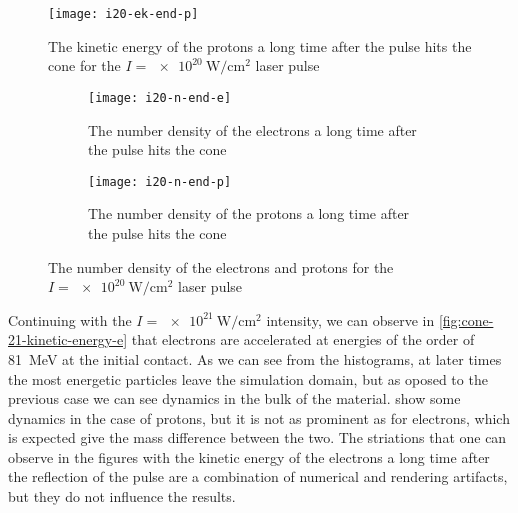\documentclass[12pt, class=report, crop=false]{standalone}
\begin{document}
\begin{figure}[h]
  \centering
  \texttt{[image: i20-ek-end-p]}
  \caption{The kinetic energy of the protons a long time after the pulse
  hits the cone for the \(I=\SI{e20}{\watt\per\centi\metre\squared}\)
  laser pulse}%
  \label{fig:cone-20-kinetic-energy-p}%
\end{figure}

\begin{figure}[h]
  \centering
  \begin{subfigure}[b]{0.475\textwidth}
    \centering
    \texttt{[image: i20-n-end-e]}
    \caption{The number density of the electrons a long time after the pulse
    hits the cone}%
  \end{subfigure}
  \hfill
  \begin{subfigure}[b]{0.475\textwidth}
    \centering
    \texttt{[image: i20-n-end-p]}
    \caption{The number density of the protons a long time after the pulse
    hits the cone}%
  \end{subfigure}
  \caption{The number density of the electrons and protons for the
  \(I=\SI{e20}{\watt\per\centi\metre\squared}\) laser pulse}%
  \label{fig:cone-20-number-density}%
\end{figure}

Continuing with the \(I=\SI{e21}{\watt\per\centi\metre\squared}\) intensity,
we can observe in \cref{fig:cone-21-kinetic-energy-e} that electrons are
accelerated at energies of the order of \SI{81}{\mega\eV} at the initial contact.
As we can see from the histograms, at later times the most energetic particles
leave the simulation domain, but as oposed to the previous case we can see
dynamics in the bulk of the material.  show
some dynamics in the case of protons, but it is not as prominent as for electrons,
which is expected give the mass difference between the two.
The striations that one can observe in the figures with the kinetic energy of the
electrons a long time after the reflection of the pulse are a combination of
numerical and rendering artifacts, but they do not influence the results.
\end{document}
